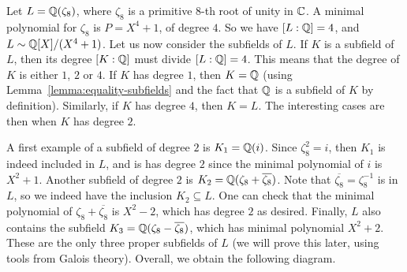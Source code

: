 \begin{example}
Let $L = \mathbb{Q}(\zeta_8)$, where $\zeta_8$ is a primitive $8$-th root of unity in $\mathbb{C}$.  A minimal polynomial for $\zeta_8$ is $P = X^4+1$, of degree $4$. So we have $[L:\mathbb{Q}] = 4$, and $L \sim \mathbb{Q}[X]/(X^4+1)$. Let us now consider the subfields of $L$. If $K$ is a subfield of $L$, then its degree $[K:\mathbb{Q}]$ must divide $[L:\mathbb{Q}] = 4$. This means that the degree of $K$ is either $1$, $2$ or $4$. If $K$ has degree $1$, then $K = \mathbb{Q}$ (using Lemma~\ref{lemma:equality-subfields} and the fact that $\mathbb{Q}$ is a subfield of $K$ by definition). Similarly, if $K$ has degree $4$, then $K = L$. The interesting cases are then when $K$ has degree $2$.

A first example of a subfield of degree $2$ is $K_1 = \mathbb{Q}(i)$. Since $\zeta_8^2 = i$, then $K_1$ is indeed included in $L$, and is has degree $2$ since the minimal polynomial of $i$ is $X^2+1$. Another subfield of degree $2$ is $K_2 = \mathbb{Q}(\zeta_8+\overline{\zeta_8})$. Note that $\overline{\zeta_8} = \zeta_8^{-1}$ is in $L$, so we indeed have the inclusion $K_2 \subseteq L$. One can check that the minimal polynomial of $\zeta_8+\overline{\zeta_8}$ is $X^2-2$, which has degree $2$ as desired.
Finally, $L$ also contains the subfield $K_3 = \mathbb{Q}(\zeta_8-\overline{\zeta_8})$, which has minimal polynomial $X^2+2$. These are the only three proper subfields of $L$ (we will prove this later, using tools from Galois theory). Overall, we obtain the following diagram.

\begin{center}
\end{center}
\end{example}

